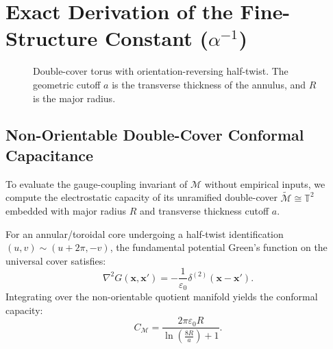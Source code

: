 \documentclass[11pt, a4paper, twocolumn]{article}
\theoremstyle{plain}
\theoremstyle{definition}
\begin{document}
\section{Exact Derivation of the Fine-Structure Constant ($\alpha^{-1}$)}
\label{sec:alpha}

\begin{figure}[h]
\centering
{}
\caption{Double-cover torus with orientation-reversing half-twist. The geometric cutoff $a$ is the transverse thickness of the annulus, and $R$ is the major radius.}
\label{fig:torus}
\end{figure}

\subsection{Non-Orientable Double-Cover Conformal Capacitance}
To evaluate the gauge-coupling invariant of $\mathcal{M}$ without empirical inputs, we compute the electrostatic capacity of its unramified double-cover $\widetilde{\mathcal{M}} \cong \mathbb{T}^2$ embedded with major radius $R$ and transverse thickness cutoff $a$.

For an annular/toroidal core undergoing a half-twist identification $(u, v) \sim (u + 2\pi, -v)$, the fundamental potential Green's function on the universal cover satisfies:
\[
\nabla^2 G(\mathbf{x}, \mathbf{x}') = -\frac{1}{\varepsilon_0} \delta^{(2)}(\mathbf{x} - \mathbf{x}').
\]
Integrating over the non-orientable quotient manifold yields the conformal capacity:
\[
C_{\mathcal{M}} = \frac{2\pi \varepsilon_0 R}{\ln\left(\frac{8R}{a}\right) + 1}.
\]
\end{document}
